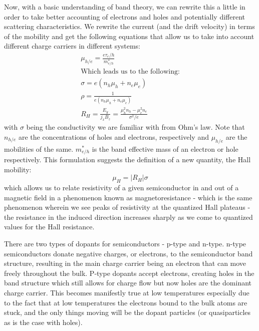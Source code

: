 \documentclass[reprint, nobibnotes, amssymb, amsmath, amsfonts, physics, mathtools, mathrsfs, floatfix]{revtex4-1}
\begin{document}
    Now, with a basic understanding of band theory, we can rewrite this a little in order to take better accounting of electrons and holes and potentially different scattering characteristics.  We rewrite the current (and the drift velocity) in terms of the mobility and get the following equations that allow us to take into account different charge carriers in different systems:
    \begin{gather}
      \mu_{h/e} = \frac{e \tau_e/h}{m_{e/h}^*} \label{mobility} \\
      \text{Which leads us to the following:} \nonumber \\
      \sigma = e(n_h\mu_h + n_e\mu_e) \label{conductivity} \\
      \rho = \frac{1}{e(n_h\mu_h + n_e\mu_e)} \label{resistivity} \\
      R_H = \frac{E_y}{j_x B_z} = \frac{\mu_h^2 n_h - \mu_e^2 n_e}{\sigma^2/e} \label{rh_mob_sigma}
    \end{gather}
    with $\sigma$ being the conductivity we are familiar with from Ohm's law.  Note that $n_{h/e}$ are the concentrations of holes and electrons, respectively and $\mu_{h/e}$ are the mobilities of the same.  $m_{e/h}^*$ is the band effective mass of an electron or hole respectively.  This formulation suggests the definition of a new quantity, the Hall mobility:
    \begin{equation}
      \mu_H = |R_H|\sigma \label{hall_mobility}
    \end{equation}
    which allows us to relate resistivity of a given semiconductor in and out of a magnetic field in a phenomenon known as magnetoresistance - which is the same phenomenon wherein we see peaks of resistivity at the quantized Hall plateaus - the resistance in the induced direction increases sharply as we come to quantized values for the Hall resistance.

    There are two types of dopants for semiconductors - p-type and n-type.  n-type semiconductors donate negative charges, or electrons, to the semiconductor band structure, resulting in the main charge carrier being an electron that can move freely throughout the bulk.  P-type dopants accept electrons, creating holes in the band structure which still allows for charge flow but now holes are the dominant charge carrier.  This becomes manifestly true at low temperatures especially due to the fact that at low temperatures the electrons bound to the bulk atoms are stuck, and the only things moving will be the dopant particles (or quasiparticles as is the case with holes).
\end{document}

